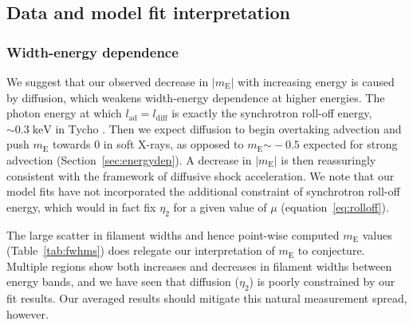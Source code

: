 \documentclass[iop, apj, numberedappendix]{emulateapj}
\newcommand*{\mt}{\mathrm}
\newcommand*{\unit}[1]{\;\mt{#1}}  %
\newcommand*{\abt}{\mathord{\sim}} %
\newcommand*{\mE}{m_\mt{E}}
\newcommand*{\Ecut}{E_{\mt{cut}}}
\begin{document}
\subsection{Data and model fit interpretation}

\subsubsection{Width-energy dependence}

We suggest that our observed decrease in $|\mE|$ with increasing energy is
caused by diffusion, which weakens width-energy dependence at higher energies.
The photon energy at which $l_{\mt{ad}} = l_{\mt{diff}}$ is exactly the
synchrotron roll-off energy,  %
$\abt 0.3 \unit{keV}$ in Tycho \citep{hwang2002}.  Then we expect diffusion to
begin overtaking advection and push $\mE$ towards $0$ in soft X-rays, as
opposed to $\mE \abt -0.5$ expected for strong advection
(Section~\ref{sec:energydep}).  A decrease in $|\mE|$ is then reassuringly
consistent with the framework of diffusive shock acceleration.
We note that our model fits have not incorporated the additional constraint of
synchrotron roll-off energy, which would in fact fix $\eta_2$ for a given value
of $\mu$ (equation~\eqref{eq:rolloff}).


The large scatter in filament widths and hence point-wise computed $\mE$ values
(Table~\ref{tab:fwhms}) does relegate our interpretation of $\mE$ to conjecture.
Multiple regions show both increases and decreases in filament widths between
energy bands, and we have seen that diffusion ($\eta_2$) is poorly constrained
by our fit results.  Our averaged results should mitigate this natural
measurement spread, however.
\end{document}
